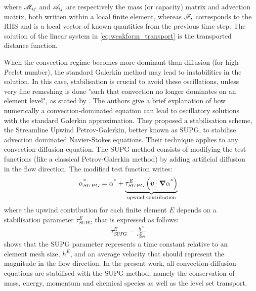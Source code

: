 where $\mathscr{M}_{ij}$ and $\mathscr{A}_{ij}$ are respectively the mass (or capacity) matrix and advection matrix, both written within a local 
finite element, whereas $\mathscr{F}_{i}$ corresponds to the RHS and is a local vector of known quantities from the previous time step. The solution of the linear
system in \cref{eq:weakform_transport} is the transported distance function.

When the convection regime becomes more dominant than diffusion (for high Peclet number), the standard Galerkin method may lead to instabilities in
the solution. In this case, stabilisation is crucial to avoid these oscillations, unless very fine remeshing is done "such that
convection no longer dominates on an element level", as stated by \citet{brooks_streamline_1982}.
The authors give a brief explanation of how numerically a convection-dominated equation can lead to oscillatory solutions with
the standard Galerkin approximation.
They proposed a stabilisation scheme, the Streamline Upwind Petrov-Galerkin, better known as SUPG, to stabilise advection dominated
Navier-Stokes equations. Their technique applies to any convection-diffusion equation.
The SUPG method consists of modifying the test functions (like a classical Petrov-Galerkin method) by adding artificial
diffusion in the flow direction. The modified test function writes:
\begin{align}
\label{eq:testfuntion_supg}
\alpha_{SUPG}^\text{*} = \alpha^\text{*} + \underbrace{\tau^E_{SUPG} \left( \boldsymbol{v} \cdot \boldsymbol{\nabla} \alpha^\text{*} \right)}_{\text{upwind contribution}}
\end{align}
where the upwind contribution for each finite element $E$ depends on a stabilisation parameter $\tau^E_{SUPG}$ that is expressed as follows:
\begin{align}
\label{eq:supg_constant}
\tau^E_{SUPG} = \frac{h^E}{v^E_\text{flow}}
\end{align}
 shows that the SUPG parameter represents a time 
constant relative to an element mesh size, $h^E$, and an average velocity
that should represent the magnitude in the flow direction.
In the present work, all convection-diffusion equations are stabilised with the SUPG method, 
namely the conservation of mass, energy, momentum and chemical species as well as the level set transport.
%
